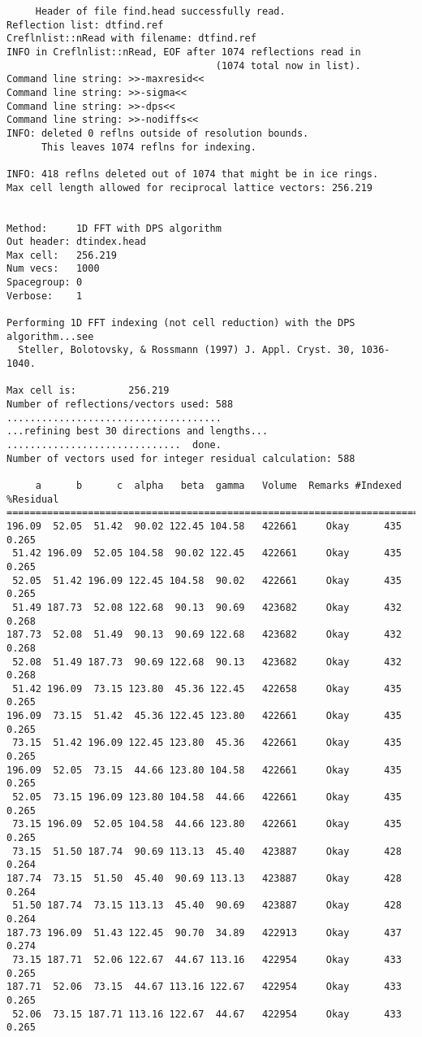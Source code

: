 \documentclass[a4paper, 11pt]{article}
\begin{document}
{\begin{verbatim}
     Header of file find.head successfully read.
Reflection list: dtfind.ref
Creflnlist::nRead with filename: dtfind.ref
INFO in Creflnlist::nRead, EOF after 1074 reflections read in
                                    (1074 total now in list).
Command line string: >>-maxresid<<
Command line string: >>-sigma<<
Command line string: >>-dps<<
Command line string: >>-nodiffs<<
INFO: deleted 0 reflns outside of resolution bounds.
      This leaves 1074 reflns for indexing.

INFO: 418 reflns deleted out of 1074 that might be in ice rings.
Max cell length allowed for reciprocal lattice vectors: 256.219


Method:     1D FFT with DPS algorithm
Out header: dtindex.head
Max cell:   256.219
Num vecs:   1000
Spacegroup: 0
Verbose:    1

Performing 1D FFT indexing (not cell reduction) with the DPS algorithm...see
  Steller, Bolotovsky, & Rossmann (1997) J. Appl. Cryst. 30, 1036-1040.

Max cell is:         256.219
Number of reflections/vectors used: 588
.....................................
...refining best 30 directions and lengths...
..............................  done.
Number of vectors used for integer residual calculation: 588

     a      b      c  alpha   beta  gamma   Volume  Remarks #Indexed %Residual
==============================================================================
196.09  52.05  51.42  90.02 122.45 104.58   422661     Okay      435     0.265
 51.42 196.09  52.05 104.58  90.02 122.45   422661     Okay      435     0.265
 52.05  51.42 196.09 122.45 104.58  90.02   422661     Okay      435     0.265
 51.49 187.73  52.08 122.68  90.13  90.69   423682     Okay      432     0.268
187.73  52.08  51.49  90.13  90.69 122.68   423682     Okay      432     0.268
 52.08  51.49 187.73  90.69 122.68  90.13   423682     Okay      432     0.268
 51.42 196.09  73.15 123.80  45.36 122.45   422658     Okay      435     0.265
196.09  73.15  51.42  45.36 122.45 123.80   422661     Okay      435     0.265
 73.15  51.42 196.09 122.45 123.80  45.36   422661     Okay      435     0.265
196.09  52.05  73.15  44.66 123.80 104.58   422661     Okay      435     0.265
 52.05  73.15 196.09 123.80 104.58  44.66   422661     Okay      435     0.265
 73.15 196.09  52.05 104.58  44.66 123.80   422661     Okay      435     0.265
 73.15  51.50 187.74  90.69 113.13  45.40   423887     Okay      428     0.264
187.74  73.15  51.50  45.40  90.69 113.13   423887     Okay      428     0.264
 51.50 187.74  73.15 113.13  45.40  90.69   423887     Okay      428     0.264
187.73 196.09  51.43 122.45  90.70  34.89   422913     Okay      437     0.274
 73.15 187.71  52.06 122.67  44.67 113.16   422954     Okay      433     0.265
187.71  52.06  73.15  44.67 113.16 122.67   422954     Okay      433     0.265
 52.06  73.15 187.71 113.16 122.67  44.67   422954     Okay      433     0.265



\end{verbatim}}
\end{document}
